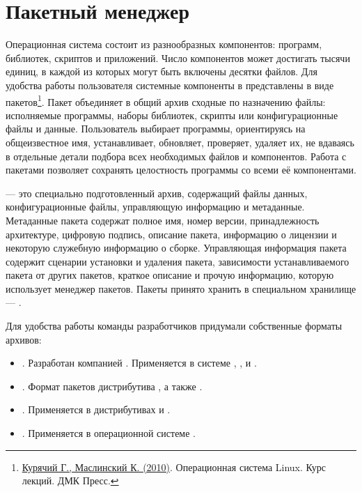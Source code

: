 \chapter{Пакетный менеджер}\label{package-manager}
Операционная система состоит из разнообразных компонентов: программ, библиотек, скриптов и приложений.
Число компонентов может достигать тысячи единиц, в каждой из которых могут быть включены десятки файлов.
Для удобства работы пользователя системные компоненты в  представлены в виде
пакетов\footnote{\href{https://docs.altlinux.org/books/altlibrary-linuxintro2.pdf}{Курячий Г., Маслинский К. (2010)}.
	Операционная система Linux. Курс лекций. ДМК Пресс.}. Пакет объединяет в общий архив сходные по назначению файлы: исполняемые программы, наборы библиотек, скрипты или конфигурационные файлы и данные.
Пользователь выбирает программы, ориентируясь на общеизвестное имя, устанавливает, обновляет, проверяет,
удаляет их, не вдаваясь в отдельные детали подбора всех необходимых файлов и компонентов.
Работа с пакетами позволяет сохранять целостность программы со всеми её компонентами.

 --- это специально подготовленный архив, содержащий файлы данных, конфигурационные файлы,
управляющую информацию и метаданные. Метаданные пакета содержат полное имя, номер версии, принадлежность
архитектуре, цифровую подпись, описание пакета, информацию о лицензии и некоторую служебную информацию
о сборке. Управляющая информация пакета содержит сценарии установки и удаления пакета, зависимости
устанавливаемого пакета от других пакетов, краткое описание и прочую информацию, которую использует
менеджер пакетов. Пакеты принято хранить в специальном хранилище --- .

Для удобства работы команды разработчиков придумали собственные форматы архивов:

\begin{itemize}
	\item {}. Разработан компанией . Применяется в системе , ,  и .
	\item {}. Формат пакетов дистрибутива , а также .
	\item {}. Применяется в дистрибутивах  и .
	\item {}. Применяется в операционной системе .
\end{itemize}

